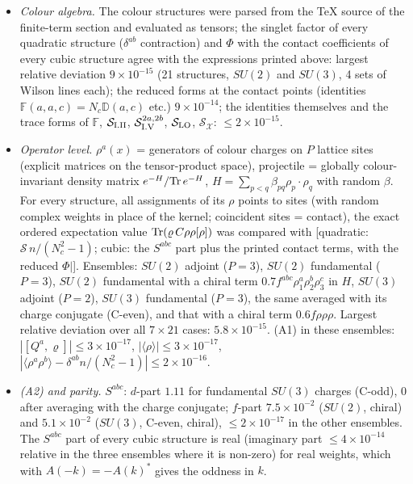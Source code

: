 \documentclass[10pt]{article}
\def\mf#1{\mathbb{#1}}
\begin{document}
\begin{itemize}
\item \emph{Colour algebra.} The colour structures were parsed from the TeX source of the finite-term section and evaluated as tensors; the singlet factor of every quadratic structure ($\delta^{ab}$ contraction) and $\Phi$ with the contact coefficients of every cubic structure agree with the expressions printed above: largest relative deviation $9\times10^{-15}$ (21 structures, $SU(2)$ and $SU(3)$, 4 sets of Wilson lines each); the reduced forms at the contact points (identities $\mf{F}(a,a,c)=N_{c}\mf{D}(a,c)$ etc.) $9\times10^{-14}$; the identities themselves and the trace forms of $\mf{F}$, $\mathcal{S}_{\rm I.II}$, $\mathcal{S}^{2a,2b}_{\rm I.V}$, $\mathcal{S}_{\rm LO}$, $\mathcal{S}_{\mathcal{X}}$: $\le2\times10^{-15}$.
\item \emph{Operator level.} $\rho^{a}(x)$ = generators of colour charges on $P$ lattice sites (explicit matrices on the tensor-product space), projectile = globally colour-invariant density matrix $e^{-H}/{\rm Tr}\,e^{-H}$, $H=\sum_{p<q}\beta_{pq}\rho_{p}\cdot\rho_{q}$ with random $\beta$. For every structure, all assignments of its $\rho$ points to sites (with random complex weights in place of the kernel; coincident sites = contact), the exact ordered expectation value ${\rm Tr}(\varrho\,C\rho\rho[\rho])$ was compared with [quadratic: $\mathcal{S}\,n/(N_{c}^{2}-1)$; cubic: the $S^{abc}$ part plus the printed contact terms, with the reduced $\Phi|$]. Ensembles: $SU(2)$ adjoint ($P=3$), $SU(2)$ fundamental ($P=3$), $SU(2)$ fundamental with a chiral term $0.7f^{abc}\rho^{a}_{1}\rho^{b}_{2}\rho^{c}_{3}$ in $H$, $SU(3)$ adjoint ($P=2$), $SU(3)$ fundamental ($P=3$), the same averaged with its charge conjugate (C-even), and that with a chiral term $0.6f\rho\rho\rho$. Largest relative deviation over all $7\times21$ cases: $5.8\times10^{-15}$. (A1) in these ensembles: $|[Q^{a},\varrho]|\le3\times10^{-17}$, $|\langle\rho\rangle|\le3\times10^{-17}$, $|\langle\rho^{a}\rho^{b}\rangle-\delta^{ab}n/(N_{c}^{2}-1)|\le2\times10^{-16}$.
\item \emph{(A2) and parity.} $S^{abc}$: $d$-part $1.11$ for fundamental $SU(3)$ charges (C-odd), $0$ after averaging with the charge conjugate; $f$-part $7.5\times10^{-2}$ ($SU(2)$, chiral) and $5.1\times10^{-2}$ ($SU(3)$, C-even, chiral), $\le2\times10^{-17}$ in the other ensembles. The $S^{abc}$ part of every cubic structure is real (imaginary part $\le4\times10^{-14}$ relative in the three ensembles where it is non-zero) for real weights, which with $A(-k)=-A(k)^{*}$ gives the oddness in $k$.

\end{itemize}
\end{document}
